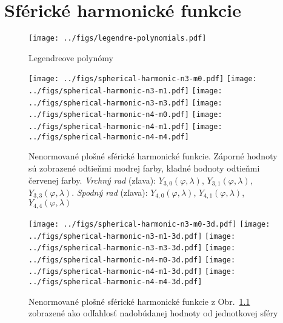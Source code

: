 \documentclass[a4paper, 12pt]{book}
\begin{document}







\chapter{Sférické harmonické funkcie}




\begin{figure}[bt]
\centering
\texttt{[image: ../figs/legendre-polynomials.pdf]}
\caption{Legendreove polynómy}
\end{figure}




\begin{figure}[bt]
\centering
\texttt{[image: ../figs/spherical-harmonic-n3-m0.pdf]}
\texttt{[image: ../figs/spherical-harmonic-n3-m1.pdf]}
\texttt{[image: ../figs/spherical-harmonic-n3-m3.pdf]}
\texttt{[image: ../figs/spherical-harmonic-n4-m0.pdf]}
\texttt{[image: ../figs/spherical-harmonic-n4-m1.pdf]}
\texttt{[image: ../figs/spherical-harmonic-n4-m4.pdf]}
\caption{Nenormované plošné sférické harmonické funkcie.  Záporné hodnoty sú 
zobrazené odtieňmi modrej farby, kladné hodnoty odtieňmi červenej farby.  
\textit{Vrchný rad} (zľava): $Y_{3,0}(\varphi, \lambda)$, $Y_{3,1}(\varphi, 
\lambda)$, $Y_{3,3}(\varphi, \lambda)$.  \textit{Spodný rad} (zľava): 
$Y_{4,0}(\varphi, \lambda)$, $Y_{4,1}(\varphi, \lambda)$, $Y_{4,4}(\varphi, 
\lambda)$}
\label{fig:sh}
\end{figure}


\begin{figure}[bt]
\centering
\texttt{[image: ../figs/spherical-harmonic-n3-m0-3d.pdf]}
\texttt{[image: ../figs/spherical-harmonic-n3-m1-3d.pdf]}
\texttt{[image: ../figs/spherical-harmonic-n3-m3-3d.pdf]}
\texttt{[image: ../figs/spherical-harmonic-n4-m0-3d.pdf]}
\texttt{[image: ../figs/spherical-harmonic-n4-m1-3d.pdf]}
\texttt{[image: ../figs/spherical-harmonic-n4-m4-3d.pdf]}
\caption{Nenormované plošné sférické harmonické funkcie z Obr.~\ref{fig:sh} 
zobrazené ako odľahlosť nadobúdanej hodnoty od jednotkovej sféry}
\label{fig:sh3d}
\end{figure}
\end{document}
